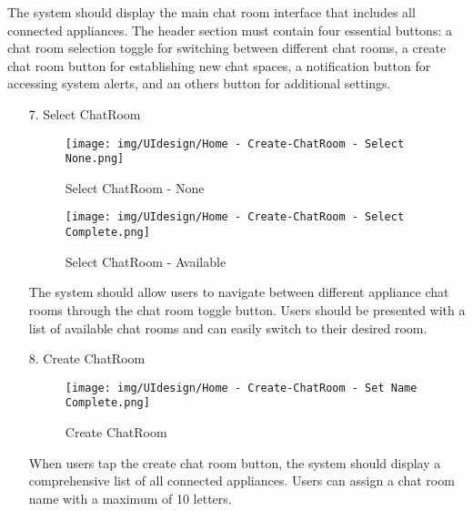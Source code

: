 \documentclass[conference]{IEEEtran}
\begin{document}
\begin{enumerate}
\begin{itemize}
\begin{itemize}
\begin{enumerate}
\begin{enumerate}
    The system should display the main chat room interface that includes all connected appliances. The header section must contain four essential buttons: a chat room selection toggle for switching between different chat rooms, a create chat room button for establishing new chat spaces, a notification button for accessing system alerts, and an others button for additional settings. \\
\end{enumerate}

\begin{enumerate}
    \item[7.] Select ChatRoom
    \begin{figure}[h]
        \centering
        \begin{minipage}{0.4\columnwidth}
            \texttt{[image: img/UIdesign/Home - Create-ChatRoom - Select None.png]}
            \caption{Select ChatRoom - None}
        \end{minipage}
        \hfill
        \begin{minipage}{0.4\columnwidth}
            \texttt{[image: img/UIdesign/Home - Create-ChatRoom - Select Complete.png]}
            \caption{Select ChatRoom - Available}
        \end{minipage}
    \end{figure}
    
    The system should allow users to navigate between different appliance chat rooms through the chat room toggle button. Users should be presented with a list of available chat rooms and can easily switch to their desired room. \\
\end{enumerate}

\begin{enumerate}
    \item[8.] Create ChatRoom
    \begin{figure}[h]
        {\centering
        \hspace{4cm}
        \begin{minipage}{0.4\columnwidth}
            \texttt{[image: img/UIdesign/Home - Create-ChatRoom - Set Name Complete.png]}
            \caption{Create ChatRoom}
        \end{minipage}}
    \end{figure}
    
    When users tap the create chat room button, the system should display a comprehensive list of all connected appliances. Users can assign a chat room name with a maximum of 10 letters.\\
\end{enumerate}


\end{enumerate}
\end{itemize}
\end{itemize}
\end{enumerate}
\end{document}
